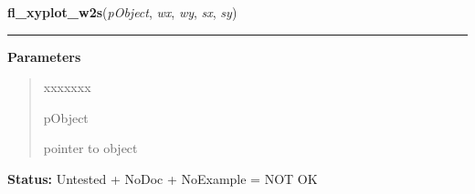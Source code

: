     \label{xformslib:library:fl_xyplot_w2s}

    \vspace{0.5ex}

\hspace{.8\funcindent}\begin{boxedminipage}{\funcwidth}

    \raggedright \textbf{fl\_xyplot\_w2s}(\textit{pObject}, \textit{wx}, \textit{wy}, \textit{sx}, \textit{sy})

    \vspace{-1.5ex}

    \rule{\textwidth}{0.5\fboxrule}
\setlength{\parskip}{2ex}
\setlength{\parskip}{1ex}
      \textbf{Parameters}
      \vspace{-1ex}

      \begin{quote}
        \begin{Ventry}{xxxxxxx}

          \item[pObject]

          pointer to object

        \end{Ventry}

      \end{quote}

\textbf{Status:} Untested + NoDoc + NoExample = NOT OK



    \end{boxedminipage}

    \label{xformslib:library:fl_set_xyplot_xscale}

    \vspace{0.5ex}

